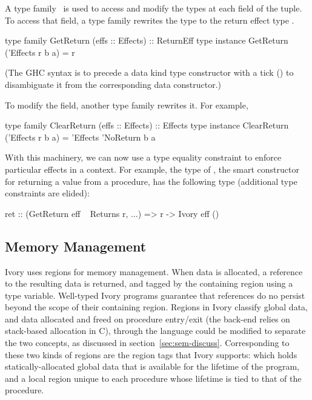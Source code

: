 A type family~\cite{typefamilies} is used to access and modify the types at each field of
the tuple. To access that field, a type family rewrites the  type to
the return effect type .

\begin{code}
type family   GetReturn (effs :: Effects) :: ReturnEff
type instance GetReturn ('Effects r b a) = r
\end{code}

\noindent
(The GHC syntax is to precede a data kind type constructor with a tick ()
to disambiguate it from the corresponding data constructor.)

To modify the field, another type family rewrites it. For example,

\begin{code}
type family   ClearReturn (effs :: Effects) :: Effects
type instance ClearReturn ('Effects r b a) =
  'Effects 'NoReturn b a
\end{code}

With this machinery, we can now use a type equality constraint to enforce
particular effects in a context. For example, the type of , the smart
constructor for returning a value from a procedure, has the following type
(additional type constraints are elided):

\begin{code}
ret :: (GetReturn eff ~ Returns r, ...)
    => r -> Ivory eff ()
\end{code}

\subsection{Memory Management}
\label{sec:ref}

Ivory uses regions for memory management.  When data is allocated, a reference
to the resulting data is returned, and tagged by the containing region using a
type variable.  Well-typed Ivory programs guarantee that references do no
persist beyond the scope of their containing region.  Regions in Ivory classify
global data, and data allocated and freed on procedure entry/exit (the back-end
relies on stack-based allocation in C), through the language could be modified
to separate the two concepts, as discussed in section~\ref{sec:sem-discuss}.
Corresponding to these two kinds of regions are the region tags that Ivory
supports:  which holds statically-allocated global data that is
available for the lifetime of the program, and a local region unique to each
procedure whose lifetime is tied to that of the procedure.

